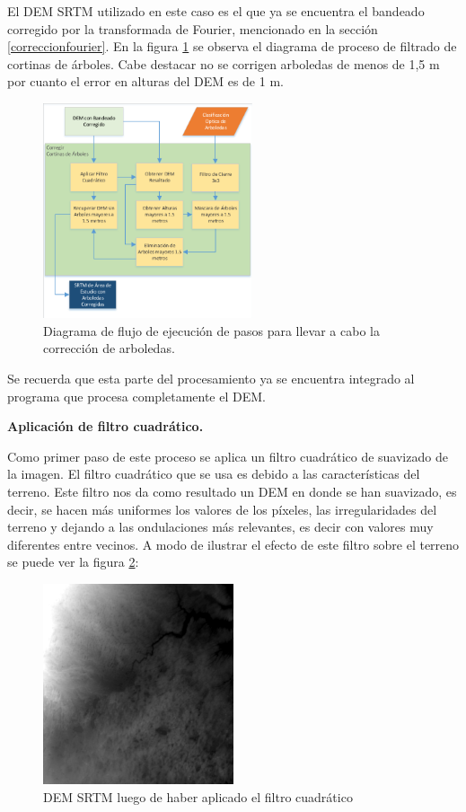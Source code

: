 \documentclass[10pt,a4paper, twoside]{report}
\begin{document}
El DEM SRTM utilizado en este caso es el que ya se encuentra el bandeado corregido por la transformada de Fourier, mencionado en la sección \ref{correccionfourier}. En la figura \ref{DiagramaArboledas} se observa el diagrama de proceso de filtrado de cortinas de árboles. Cabe destacar no se corrigen arboledas de menos de 1,5 m por cuanto el error en alturas del DEM es de 1 m.

\begin{figure}[!htb]
   \centering      
   \includegraphics[width=0.55\textwidth]{imagenes/DiagramaArboleda.pdf}
 \caption{Diagrama de flujo de ejecución de pasos para llevar a cabo la corrección de arboledas.}
 \label{DiagramaArboledas}
\end{figure}

Se recuerda que esta parte del procesamiento ya se encuentra integrado al programa que procesa completamente el DEM.

\textbf{Aplicación de filtro cuadrático.}

Como primer paso de este proceso se aplica un filtro cuadrático de suavizado de la imagen. El filtro cuadrático que se usa es debido a las características del terreno. Este filtro nos da como resultado un DEM en donde se han suavizado, es decir, se hacen más uniformes los valores de los píxeles, las irregularidades del terreno y dejando a las ondulaciones más relevantes, es decir con valores muy diferentes entre vecinos. A modo de ilustrar el efecto de este filtro sobre el terreno se puede ver la figura \ref{filtroCuadratico}:

\begin{figure}[H]
   \centering      
   \includegraphics[width=0.5\textwidth]{imagenes/filtroCuadratico.jpg}
 \caption{DEM SRTM luego de haber aplicado el filtro cuadrático}
 \label{filtroCuadratico}
\end{figure}
\end{document}
